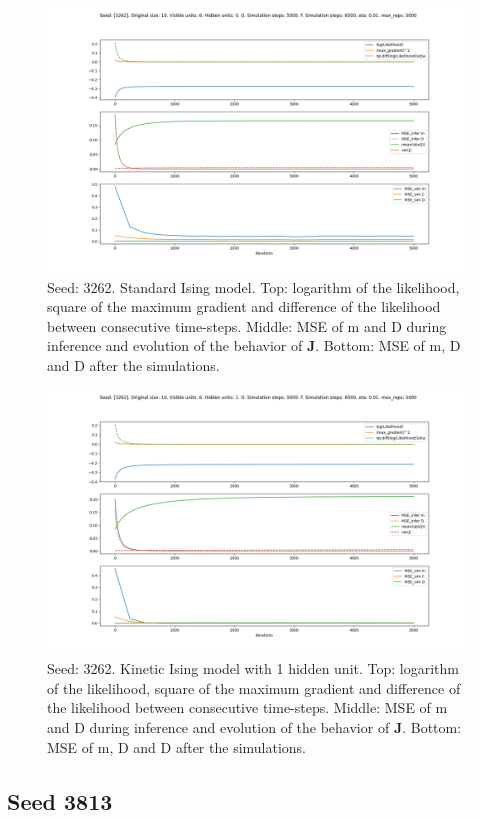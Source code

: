 \documentclass{article}
\def\*#1{\mathbf{#1}}
\begin{document}
\begin{figure}[!htb]
    \centering
    \includegraphics[width=0.7\linewidth]{images/sqrt_size/[3262]_10_6_0_5000_6500_eta001_5000_100.png}
\caption{Seed: 3262. Standard Ising model. Top: logarithm of the likelihood, square of the maximum gradient and difference of the likelihood between consecutive time-steps. Middle: MSE of m and D during inference and evolution of the behavior of $\*J$. Bottom: MSE of m, D and D after the simulations.}
\end{figure}


\begin{figure}[!htb]
    \centering
    \includegraphics[width=0.7\linewidth]{images/sqrt_size/[3262]_10_6_1_5000_6500_eta001_5000_100.png}
\caption{Seed: 3262. Kinetic Ising model with 1 hidden unit. Top: logarithm of the likelihood, square of the maximum gradient and difference of the likelihood between consecutive time-steps. Middle: MSE of m and D during inference and evolution of the behavior of $\*J$. Bottom: MSE of m, D and D after the simulations.}
\end{figure}



\newpage
\subsection{Seed 3813}
\end{document}
